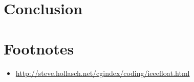 \documentclass[11pt]{article}
\begin{document}


\section{Conclusion}

\section*{Footnotes}
\begin{itemize}
\item \url{http://steve.hollasch.net/cgindex/coding/ieeefloat.html}
\end{itemize}
\appendix
\begin{appendices}

\end{appendices}
\end{document}
